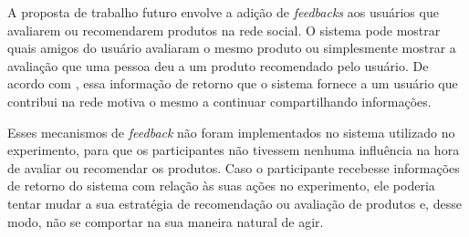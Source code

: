  A proposta de trabalho futuro envolve a adição de \textit{feedbacks} aos usuários que avaliarem ou recomendarem produtos na rede social. O sistema pode mostrar quais amigos do usuário avaliaram o mesmo produto ou simplesmente mostrar a avaliação que uma pessoa deu a um produto recomendado pelo usuário. De acordo com \cite{burke2009fmm}, essa informação de retorno que o sistema fornece a um usuário que contribui na rede motiva o mesmo a continuar compartilhando informações.
 
 Esses mecanismos de \textit{feedback} não foram implementados no sistema utilizado no experimento, para que os participantes não tivessem nenhuma influência na hora de avaliar ou recomendar os produtos. Caso o participante recebesse informações de retorno do sistema com relação às suas ações no experimento, ele poderia tentar mudar a sua estratégia de recomendação ou avaliação de produtos e, desse modo, não se comportar na sua maneira natural de agir.




